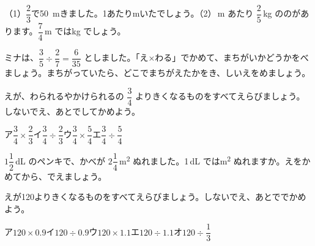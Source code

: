 \bkproblem （1）\nobreak $\dfrac{2}{3}$で\qty{50}{m}きました。1あたりmいたでしょう。\quad（2）\,m あたり $\dfrac{2}{5}$\,kg ののがあります。$\dfrac{7}{4}$\,m ではkg でしょう。


\bkproblem ミナは、$\dfrac{3}{5}\div\dfrac{2}{7}=\dfrac{6}{35}$ としました。「え×わる」でかめて、まちがいかどうかをべましょう。まちがっていたら、どこでまちがえたかをき、しいえをめましょう。

\bkproblem {}えが、わられるやかけられるの $\dfrac{3}{4}$ よりきくなるものをすべてえらびましょう。しないでえ、あとでしてかめよう。\par
ア\enspace\mbox{$\dfrac{3}{4}\times\dfrac{2}{3}$}\quad イ\enspace\mbox{$\dfrac{3}{4}\div\dfrac{2}{3}$}\quad ウ\enspace\mbox{$\dfrac{3}{4}\times\dfrac{5}{4}$}\quad エ\enspace\mbox{$\dfrac{3}{4}\div\dfrac{5}{4}$}

\bkproblem $1\dfrac{1}{2}$\,dL のペンキで、かべが $2\dfrac{1}{4}$\,\unit{m^2} ぬれました。1\,dL では\unit{m^2} ぬれますか。えをかめてから、でえましょう。

\bkproblem {}えが120よりきくなるものをすべてえらびましょう。しないでえ、あとででかめよう。\par
ア\enspace\mbox{$120\times0.9$}\quad イ\enspace\mbox{$120\div0.9$}\quad ウ\enspace\mbox{$120\times1.1$}\quad エ\enspace\mbox{$120\div1.1$}\quad オ\enspace\mbox{$120\div\dfrac{1}{3}$}

